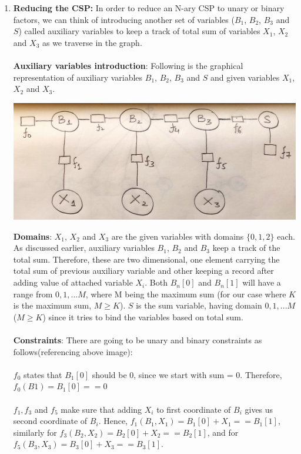 \documentclass[12pt]{article}
\begin{document}
\begin{enumerate}[label=(\alph*)]
  \item \textbf{Reducing the CSP:} In order to reduce an N-ary CSP to unary or binary factors, we can think of introducing another set of variables ($B_1$, $B_2$, $B_3$ and $S$) called auxiliary variables to keep a track of total sum of variables $X_1$, $X_2$ and $X_3$ as we traverse in the graph.\\ \\
  \textbf{Auxiliary variables introduction}: Following is the graphical representation of auxiliary variables $B_1$, $B_2$, $B_3$ and $S$ and given variables $X_1$, $X_2$ and $X_3$.
  \begin{center}
  \includegraphics[scale=0.1]{IMG_2240.jpg}
  \end{center}
  \textbf{Domains}: $X_1$, $X_2$ and $X_3$ are the given variables with domains $\{0, 1, 2\}$ each. As discussed earlier, auxiliary variables $B_1$, $B_2$ and $B_3$ keep a track of the total sum. Therefore, these are two dimensional, one element carrying the total sum of previous auxiliary variable and other keeping a record after adding value of attached variable $X_i$. Both $B_n[0]$ and $B_n[1]$ will have a range from $0, 1, ... M$, where M being the maximum sum (for our case where $K$ is the maximum sum, $M \geq K$). $S$ is the sum variable, having domain $0, 1, ... M$ ($M \geq K$) since it tries to bind the variables based on total sum. \\ \\
  \textbf{Constraints}: There are going to be unary and binary constraints as follows(referencing above image): \\ \\
  $f_0$ states that $B_1[0]$ should be 0, since we start with sum = 0. Therefore, $f_0(B1) = B_1[0] == 0$ \\ \\
  $f_1, f_3$ and $f_5$ make sure that adding $X_i$ to first coordinate of $B_i$ gives us second coordinate of $B_i$. Hence, $f_1(B_1, X_1) = B_1[0] + X_1 == B_1[1]$, similarly for $f_3(B_2, X_2) = B_2[0] + X_2 == B_2[1]$, and for $f_5(B_3, X_3) = B_3[0] + X_3 == B_3[1]$. \\ \\

\end{enumerate}
\end{document}
